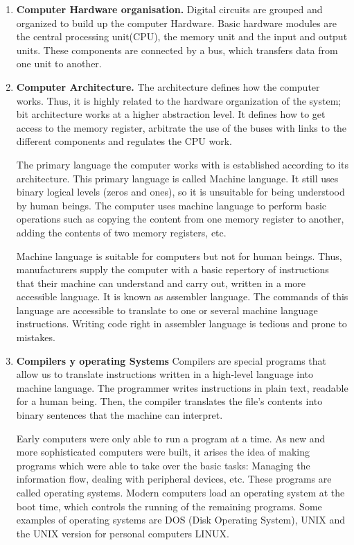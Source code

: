 \begin{paracol}{2}
\begin{enumerate}
\item \textbf{Computer Hardware organisation.} 
Digital circuits are grouped and organized to build up the computer Hardware. Basic hardware modules are the central processing unit(CPU), the memory unit and the input and output units. These components are connected by a bus, which transfers data from one unit to another.

\item \textbf{Computer Architecture.} 
The architecture defines how the computer works. Thus, it is highly related to the hardware organization of the system; bit architecture works at a higher abstraction level. It defines how to get access to the memory register, arbitrate the use of the buses with links to the different components and regulates the CPU work.   
 
The primary language the computer works with is established according to its architecture. This primary language is called Machine language. It still uses binary logical levels (zeros and ones), so it is unsuitable for being understood by human beings. The computer uses machine language to perform basic operations such as copying the content from one memory register to another, adding the contents of two memory registers, etc.     

Machine language is suitable for computers but not for human beings. Thus, manufacturers supply the computer with a basic repertory of instructions that their machine can understand and carry out, written in a more accessible language. It is known as assembler language. The commands of this language are accessible to translate to one or several machine language instructions. Writing code right in assembler language is tedious and prone to mistakes.     
   
\item \textbf{Compilers y operating Systems}  
Compilers are special programs that allow us to translate instructions written in a high-level language into machine language. The programmer writes instructions in plain text, readable for a human being. Then, the compiler translates the file's contents into binary sentences that the machine can interpret.
       
Early computers were only able to run a program at a time. As new and more sophisticated computers were built, it arises the idea of making programs which were able to take over the basic tasks:
Managing the information flow, dealing with peripheral devices, etc. These programs are called operating systems. Modern computers load an operating system at the boot time, which controls the running of the remaining programs. Some examples of operating systems are DOS (Disk Operating System), UNIX and the UNIX version for personal computers LINUX.       


\end{enumerate}
\end{paracol}
